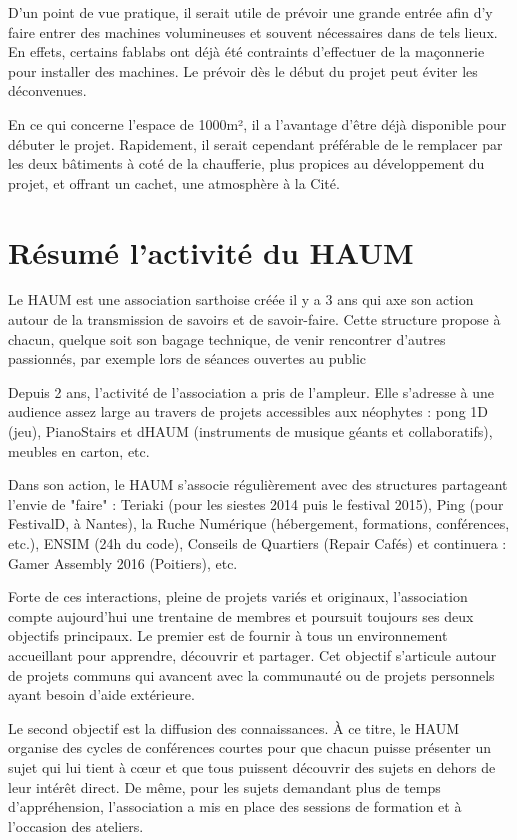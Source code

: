 \documentclass[a4paper,10pt]{scrartcl}
\begin{document}
D'un point de vue pratique, il serait utile de prévoir une grande entrée afin d'y faire entrer des machines volumineuses et souvent nécessaires dans de tels lieux. En effets, certains fablabs ont déjà été contraints d'effectuer de la maçonnerie pour installer des machines. Le prévoir dès le début du projet peut éviter les déconvenues.

En ce qui concerne l'espace de 1000m², il a l'avantage d'être déjà disponible pour débuter le projet. Rapidement, il serait cependant préférable de le remplacer par les deux bâtiments à coté de la chaufferie, plus propices au développement du projet, et offrant un cachet, une atmosphère à la Cité. 

\section{Résumé l'activité du HAUM}

Le HAUM est une association sarthoise créée il y a 3 ans qui axe son action autour de la transmission de savoirs et de savoir-faire. Cette structure propose à chacun, quelque soit son bagage technique, de venir rencontrer d'autres passionnés, par exemple lors de séances ouvertes au public

Depuis 2 ans, l'activité de l'association a pris de l'ampleur. Elle s'adresse à une audience assez large au travers de projets accessibles aux néophytes : pong 1D (jeu), PianoStairs et dHAUM (instruments de musique géants et collaboratifs), meubles en carton, etc.

Dans son action, le HAUM s'associe régulièrement avec des structures partageant l'envie de "faire" : Teriaki (pour les siestes 2014 puis le festival 2015), Ping (pour FestivalD, à Nantes), la Ruche Numérique (hébergement, formations, conférences, etc.), ENSIM (24h du code), Conseils de Quartiers (Repair Cafés) et continuera : Gamer Assembly 2016 (Poitiers), etc.

Forte de ces interactions, pleine de projets variés et originaux, l'association compte aujourd'hui une trentaine de membres et poursuit toujours ses deux objectifs principaux. Le premier est de fournir à tous un environnement accueillant pour apprendre, découvrir et partager. Cet objectif s'articule autour de projets communs qui avancent avec la communauté ou de projets personnels ayant besoin d'aide extérieure.  

Le second objectif est la diffusion des connaissances. À ce titre, le HAUM organise des cycles de conférences courtes pour que chacun puisse présenter un sujet qui lui tient à cœur et que tous puissent découvrir des sujets en dehors de leur intérêt direct. De même, pour les sujets demandant plus de temps d'appréhension, l'association a mis en place des sessions de formation et à l'occasion des ateliers.
\end{document}
